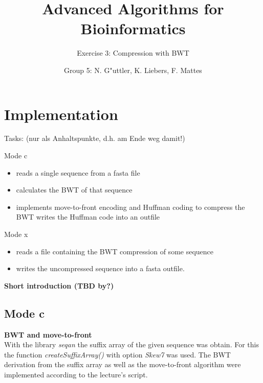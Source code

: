 \documentclass[11pt, notitlepage]{scrartcl}
\begin{document}
         


\title{Advanced Algorithms for Bioinformatics} 
\subtitle{Exercise 3: Compression with BWT}
\author{Group 5: N. G"uttler, K. Liebers, F. Mattes} %
\maketitle

\section{Implementation}


Tasks: (nur als Anhaltspunkte, d.h. am Ende weg damit!)

Mode c
\begin{itemize}
	\item   reads a single sequence from a fasta file
	   \item calculates the BWT of that sequence
    \item implements move-to-front encoding and Huffman coding to compress the BWT
    writes the Huffman code into an outfile 
	
\end{itemize}

Mode x
\begin{itemize}
	\item     reads a file containing the BWT compression of some sequence
	\item writes the uncompressed sequence into a fasta outfile. 
\end{itemize}

\textbf{Short introduction (TBD by?)}\\
\subsection{Mode c}




  
\textbf{BWT and move-to-front}\\
With the library \textit{seqan} the suffix array of the given sequence was obtain. For this the function \textit{createSuffixArray() }with option \textit{Skew7} was used. The BWT derivation from the suffix array as well as the move-to-front algorithm were implemented according to the lecture's script.
\end{document}
